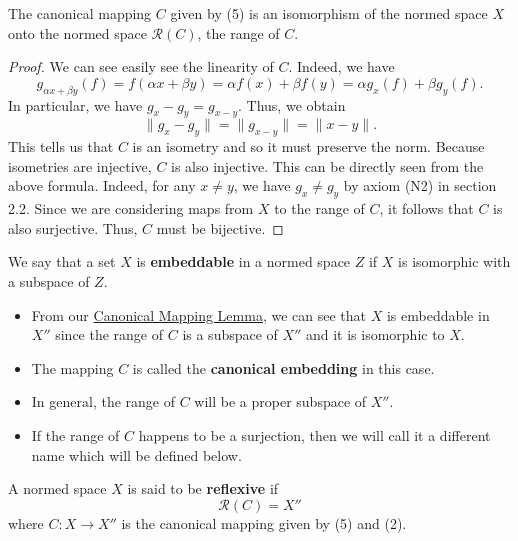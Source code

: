 \begin{lemma}\label{Canonical Mapping Lemma}
    The canonical mapping \( C  \) given by (5) is an isomorphism of the normed space \( X  \) onto the normed space \( \mathcal{R}(C) \), the range of \( C  \). 
\end{lemma}
\begin{proof}
We can see easily see the linearity of \( C  \). Indeed, we have
\[  {g}_{\alpha x +  \beta y}(f) = f(\alpha x + \beta y) = \alpha f(x)  + \beta f(y) = \alpha {g}_{x}(f) + \beta {g}_{y}(f). \]
In particular, we have \( {g}_{x} - {g}_{y} = {g}_{x -y} \). Thus, we obtain 
\[  \|{g}_{x} - {g}_{y} \| = \|{g}_{x-y}\| = \|x - y\|. \]
This tells us that \( C  \) is an isometry and so it must preserve the norm. Because isometries are injective, \( C  \) is also injective. This can be directly seen from the above formula. Indeed, for any \( x \neq y  \), we have \( {g}_{x} \neq {g}_{y} \) by axiom (N2) in section 2.2. Since we are considering maps from \( X  \) to the range of \( C  \), it follows that \( C  \) is also surjective. Thus, \( C  \) must be bijective.
\end{proof}

\begin{definition}[Embeddable]
    We say that a set \( X  \) is \textbf{embeddable} in a normed space \( Z  \) if \( X  \) is isomorphic with a subspace of \( Z  \).
\end{definition}

\begin{itemize}
    \item From our {\hyperref[Canonical Mapping Lemma]{Canonical Mapping Lemma}}, we can see that \( X  \) is embeddable in \( X'' \) since the range of \( C  \) is a subspace of \( X'' \) and it is isomorphic to \( X  \). 
    \item The mapping \( C  \) is called the \textbf{canonical embedding} in this case.
    \item In general, the range of \( C  \) will be a proper subspace of \( X'' \). 
    \item If the range of \( C  \) happens to be a surjection, then we will call it a different name which will be defined below.
\end{itemize}

\begin{definition}[Reflexivity]
    A normed space \( X  \) is said to be \textbf{reflexive} if 
    \[  \mathcal{R}(C) = X'' \]
    where \( C : X \to X'' \) is the canonical mapping given by (5) and (2).
\end{definition}

